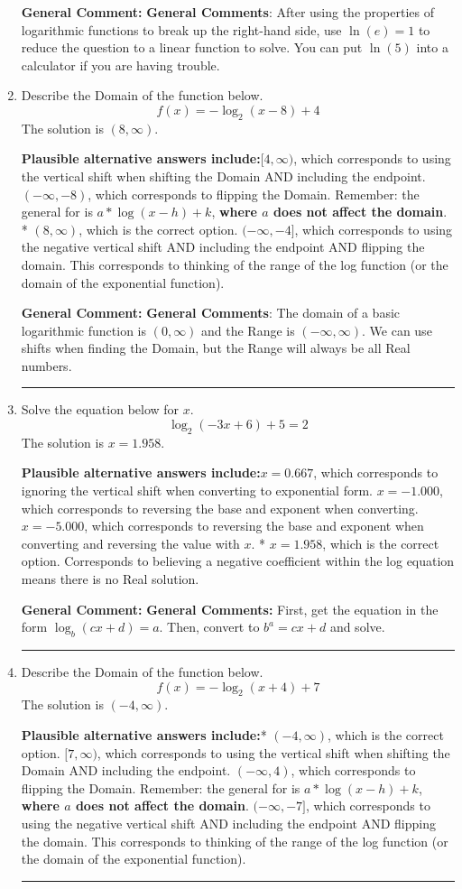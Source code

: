 \documentclass{extbook}[14pt]
\newcommand{\litem}[1]{\item #1

\rule{\textwidth}{0.4pt}}
\begin{document}
\begin{enumerate}
{\textbf{General Comment:} \textbf{General Comments}: After using the properties of logarithmic functions to break up the right-hand side, use $\ln(e) = 1$ to reduce the question to a linear function to solve. You can put $\ln(5)$ into a calculator if you are having trouble.
}
\litem{
Describe the Domain of the function below.
\[ f(x) = -\log_2{(x-8)}+4 \]The solution is \( (8, \infty) \).\begin{enumerate}[label=\Alph*.]
\textbf{Plausible alternative answers include:}$[4, \infty)$, which corresponds to using the vertical shift when shifting the Domain AND including the endpoint.
$(-\infty, -8)$, which corresponds to flipping the Domain. Remember: the general for is $a*\log(x-h)+k$, \textbf{where $a$ does not affect the domain}.
* $(8, \infty)$, which is the correct option.
$(-\infty, -4]$, which corresponds to using the negative vertical shift AND including the endpoint AND flipping the domain.
This corresponds to thinking of the range of the log function (or the domain of the exponential function).
\end{enumerate}

\textbf{General Comment:} \textbf{General Comments}: The domain of a basic logarithmic function is $(0, \infty)$ and the Range is $(-\infty, \infty)$. We can use shifts when finding the Domain, but the Range will always be all Real numbers.
}
\litem{
Solve the equation below for $x$.
\[ \log_{2}{(-3x+6)}+5 = 2 \]The solution is \( x = 1.958 \).\begin{enumerate}[label=\Alph*.]
\textbf{Plausible alternative answers include:}$x = 0.667$, which corresponds to ignoring the vertical shift when converting to exponential form.
$x = -1.000$, which corresponds to reversing the base and exponent when converting.
$x = -5.000$, which corresponds to reversing the base and exponent when converting and reversing the value with $x$.
* $x = 1.958$, which is the correct option.
Corresponds to believing a negative coefficient within the log equation means there is no Real solution.
\end{enumerate}

\textbf{General Comment:} \textbf{General Comments:} First, get the equation in the form $\log_b{(cx+d)} = a$. Then, convert to $b^a = cx+d$ and solve.
}
\litem{
Describe the Domain of the function below.
\[ f(x) = -\log_2{(x+4)}+7 \]The solution is \( (-4, \infty) \).\begin{enumerate}[label=\Alph*.]
\textbf{Plausible alternative answers include:}* $(-4, \infty)$, which is the correct option.
$[7, \infty)$, which corresponds to using the vertical shift when shifting the Domain AND including the endpoint.
$(-\infty, 4)$, which corresponds to flipping the Domain. Remember: the general for is $a*\log(x-h)+k$, \textbf{where $a$ does not affect the domain}.
$(-\infty, -7]$, which corresponds to using the negative vertical shift AND including the endpoint AND flipping the domain.
This corresponds to thinking of the range of the log function (or the domain of the exponential function).
\end{enumerate}

}
\end{enumerate}
\end{document}
